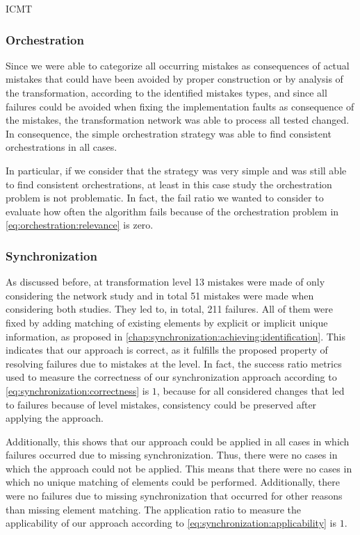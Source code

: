 \begin{copiedFrom}{ICMT}
\subsubsection{Orchestration}

Since we were able to categorize all occurring mistakes as consequences of actual mistakes that could have been avoided by proper construction or by analysis of the transformation, according to the identified mistakes types, and since all failures could be avoided when fixing the implementation faults as consequence of the mistakes, the transformation network was able to process all tested changed.
In consequence, the simple orchestration strategy was able to find consistent orchestrations in all cases.

In particular, if we consider that the strategy was very simple and was still able to find consistent orchestrations, at least in this case study the orchestration problem is not problematic.
In fact, the fail ratio we wanted to consider to evaluate how often the algorithm fails because of the orchestration problem in \autoref{eq:orchestration:relevance} is zero.


\subsubsection{Synchronization}

As discussed before, at transformation level 13 mistakes were made of only considering the network study and in total 51 mistakes were made when considering both studies.
They led to, in total, 211 failures.
All of them were fixed by adding matching of existing elements by explicit or implicit unique information, as proposed in \autoref{chap:synchronization:achieving:identification}.
This indicates that our approach is correct, as it fulfills the proposed property of resolving failures due to mistakes at the \leveltransformation level.
In fact, the success ratio metrics used to measure the correctness of our synchronization approach according to \autoref{eq:synchronization:correctness} is $1$, because for all considered changes that led to failures because of \leveltransformation level mistakes, consistency could be preserved after applying the approach.

Additionally, this shows that our approach could be applied in all cases in which failures occurred due to missing synchronization.
Thus, there were no cases in which the approach could not be applied.
This means that there were no cases in which no unique matching of elements could be performed.
Additionally, there were no failures due to missing synchronization that occurred for other reasons than missing element matching.
The application ratio to measure the applicability of our approach according to \autoref{eq:synchronization:applicability} is $1$.



\end{copiedFrom}
